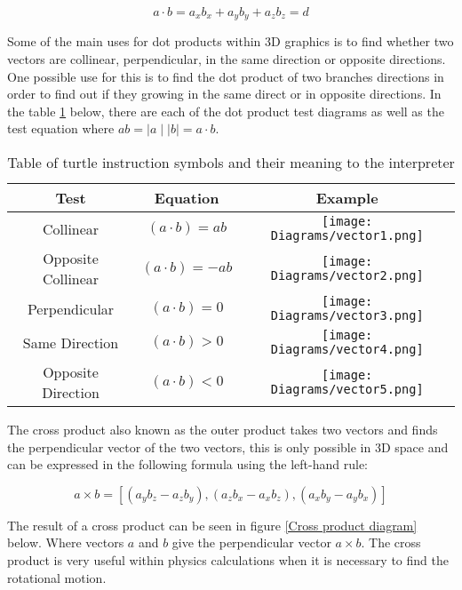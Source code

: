 \begin{equation}
a \cdot b = a_x b_x + a_y b_y + a_z b_z = d
\end{equation}

\noindent
Some of the main uses for dot products within 3D graphics is to find whether two vectors are collinear, perpendicular, in the same direction or opposite directions. One possible use for this is to find the dot product of two branches directions in order to find out if they growing in the same direct or in opposite directions. In the table \ref{dot product test} below, there are each of the dot product test diagrams as well as the test equation where $ab = \mid a \mid \mid b \mid = a \cdot b$.

\begin{table}[h!]
\centering
\begin{tabular}{ | c | c | c |}
\hline
	Test 	& Equation & Example\\  
\hline
\hline
	Collinear 							& $(a \cdot b) = ab$ & \texttt{[image: Diagrams/vector1.png]}\\
\hline
	Opposite Collinear 					& $(a \cdot b) = -ab$ &	\texttt{[image: Diagrams/vector2.png]}\\
\hline
	Perpendicular 						& $(a \cdot b) = 0$	&\texttt{[image: Diagrams/vector3.png]}\\
\hline
	Same Direction 						& $(a \cdot b) > 0$ &\texttt{[image: Diagrams/vector4.png]}\\
\hline
	Opposite Direction 					& $(a \cdot b) < 0$ &\texttt{[image: Diagrams/vector5.png]}\\
\hline

\end{tabular}
\caption{Table of turtle instruction symbols and their meaning to the interpreter}
\label{dot product test}
\end{table}
\FloatBarrier

\noindent
The cross product also known as the outer product takes two vectors and finds the perpendicular vector of the two vectors, this is only possible in 3D space and can be expressed in the following formula using the left-hand rule: 

\begin{equation}
a \times b = [(a_y b_z - a_z b_y), (a_z b_x - a_x b_z), (a_x b_y - a_y b_x)]
\end{equation}

\noindent
The result of a cross product can be seen in figure \ref{Cross product diagram} below. Where vectors $a$ and $b$ give the perpendicular vector $a \times b$. The cross product is very useful within physics calculations when it is necessary to find the rotational motion. 

